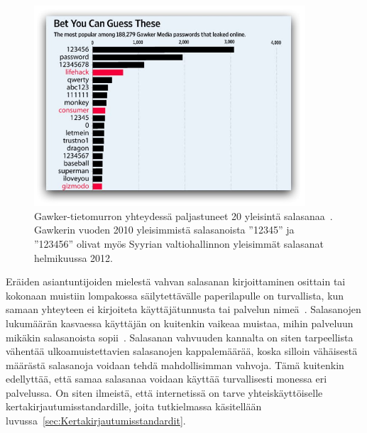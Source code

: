 \documentclass[finnish,gradu]{tktltiki}
\begin{document}
  \begin{figure}
    \centering
    \includegraphics[width=0.9\textwidth]{images/gawker_top20_passwords.jpg}
    \caption{Gawker-tietomurron yhteydessä paljastuneet 20 yleisintä salasanaa~\cite{wsj_gawker_12_2010}. Gawkerin vuoden 2010 yleisimmistä salasanoista ''12345'' ja ''123456'' olivat myös Syyrian valtiohallinnon yleisimmät salasanat helmikuussa 2012.}
    \label{fig:gawker_top20_passwords}
  \end{figure}

  Eräiden asiantuntijoiden mielestä vahvan salasanan kirjoittaminen osittain tai kokonaan muistiin lompakossa säilytettävälle paperilapulle on turvallista, kun samaan yhteyteen ei kirjoiteta käyttäjätunnusta tai palvelun nimeä~\cite{fsecure_passwords_on_postit_09, microsoft_guru_write_your_password_05, schneier_changing_passwords_10, schneier_choosing_passwords_07, schneier_write_down_your_password_05}. Salasanojen lukumäärän kasvaessa käyttäjän on kuitenkin vaikeaa muistaa, mihin palveluun mikäkin salasanoista sopii~\cite{study_of_passwords_07}. Salasanan vahvuuden kannalta on siten tarpeellista vähentää ulkoamuistettavien salasanojen kappalemäärää, koska silloin vähäisestä määrästä salasanoja voidaan tehdä mahdollisimman vahvoja. Tämä kuitenkin edellyttää, että samaa salasanaa voidaan käyttää turvallisesti monessa eri palvelussa. On siten ilmeistä, että internetissä on tarve yhteiskäyttöiselle kertakirjautumisstandardille, joita tutkielmassa käsitellään luvussa~\ref{sec:Kertakirjautumisstandardit}.

\end{document}
